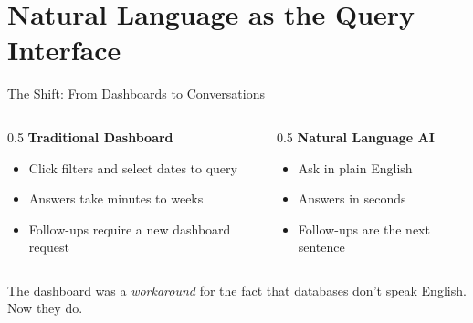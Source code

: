 \documentclass[aspectratio=169]{beamer}
\begin{document}
\section{Natural Language as the Query Interface}

\begin{frame}{The Shift: From Dashboards to Conversations}
\begin{columns}[T]
\begin{column}{0.5\textwidth}
\textbf{Traditional Dashboard}
\begin{itemize}\small
  \item Click filters and select dates to query
  \item Answers take minutes to weeks
  \item Follow-ups require a new dashboard request
\end{itemize}
\end{column}
\begin{column}{0.5\textwidth}
\textbf{Natural Language AI}
\begin{itemize}\small
  \item Ask in plain English
  \item Answers in seconds
  \item Follow-ups are the next sentence
\end{itemize}
\end{column}
\end{columns}
\vspace{0.5cm}
\centering
The dashboard was a \textit{workaround} for the fact that databases don't speak English. Now they do.
\end{frame}
\end{document}
